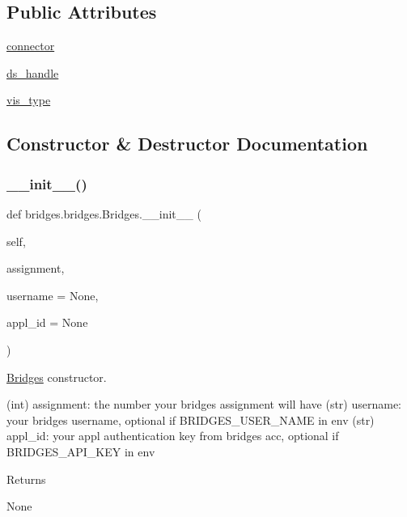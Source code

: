 \subsection*{Public Attributes}
\begin{DoxyCompactItemize}
\item 
\hyperlink{classbridges_1_1bridges_1_1_bridges_a1c02ee44e7a4a3ee2f7d9c7d7da7d09f}{connector}
\item 
\hyperlink{classbridges_1_1bridges_1_1_bridges_a7a6f25612be64d4f3e203d7d37cb4da4}{ds\+\_\+handle}
\item 
\hyperlink{classbridges_1_1bridges_1_1_bridges_a5ca152bf3830e2be1f72247463916f82}{vis\+\_\+type}
\end{DoxyCompactItemize}


\subsection{Constructor \& Destructor Documentation}
\mbox{\label{classbridges_1_1bridges_1_1_bridges_af40aff29a2bc4efbaeb4186275fe7480}} 
\subsubsection{\texorpdfstring{\+\_\+\+\_\+init\+\_\+\+\_\+()}{\_\_init\_\_()}}
{\footnotesize\ttfamily def bridges.\+bridges.\+Bridges.\+\_\+\+\_\+init\+\_\+\+\_\+ (\begin{DoxyParamCaption}\item[{}]{self,  }\item[{}]{assignment,  }\item[{}]{username = {\ttfamily None},  }\item[{}]{appl\+\_\+id = {\ttfamily None} }\end{DoxyParamCaption})}



\hyperlink{classbridges_1_1bridges_1_1_bridges}{Bridges} constructor. 

(int) assignment\+: the number your bridges assignment will have (str) username\+: your bridges username, optional if B\+R\+I\+D\+G\+E\+S\+\_\+\+U\+S\+E\+R\+\_\+\+N\+A\+ME in env (str) appl\+\_\+id\+: your appl authentication key from bridges acc, optional if B\+R\+I\+D\+G\+E\+S\+\_\+\+A\+P\+I\+\_\+\+K\+EY in env \begin{DoxyReturn}{Returns}


None 
\end{DoxyReturn}


